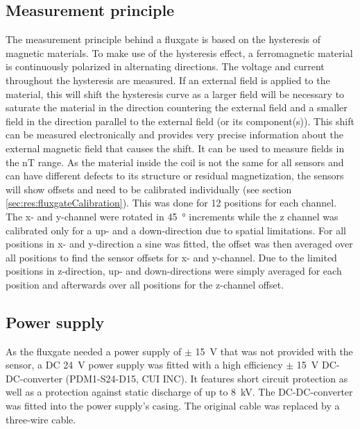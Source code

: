        \subsection{Measurement principle}
        \label{sec:matMeth:fluxgateMeasurementPrinciple}
        The measurement principle behind a fluxgate is based on the hysteresis of magnetic materials. To make use of the hysteresis effect, a ferromagnetic material is continuously polarized in alternating directions. The voltage and current throughout the hysteresis are measured. If an external field is applied to the material, this will shift the hysteresis curve as a larger field will be necessary to saturate the material in the direction countering the external field and a smaller field in the direction parallel to the external field (or its component(s)). This shift can be measured electronically and provides very precise information about the external magnetic field that causes the shift.  It can be used to measure fields in the \si{\nano\tesla} range. As the material inside the coil is not the same for all sensors and can have different defects to its structure or residual magnetization, the sensors will show offsets and need to be calibrated individually (see section \ref{sec:res:fluxgateCalibration}). This was done for 12 positions for each channel. The x- and y-channel were rotated in \SI{45}{\degree} increments while the z channel was calibrated only for a up- and a down-direction due to spatial limitations. For all positions in x- and y-direction a sine was fitted, the offset was then averaged over all positions to find the sensor offsets for x- and y-channel. Due to the limited positions in z-direction, up- and down-directions were simply averaged for each position and afterwards over all positions for the z-channel offset.
        \subsection{Power supply}
        As the fluxgate needed a power supply of $\pm$ \SI{15}{\volt} that was not provided with the sensor, a DC \SI{24}{\volt} power supply was fitted with a high efficiency $\pm$ \SI{15}{\volt} DC-DC-converter (PDM1-S24-D15, CUI INC). It features short circuit protection as well as a protection against static discharge of up to \SI{8}{\kilo\volt}. The DC-DC-converter was fitted into the power supply's casing. The original cable was replaced by a three-wire cable.

